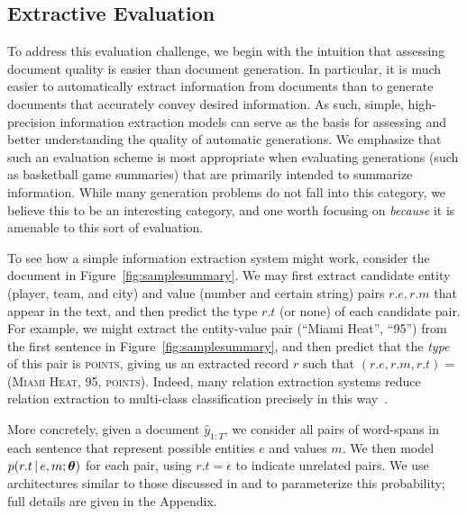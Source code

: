 \documentclass[11pt,letterpaper]{article}
\begin{document}
\subsection{Extractive Evaluation}
\label{sec:extractive}
To address this evaluation challenge, we begin with the intuition that assessing document quality is easier than document generation. In particular, it is much easier to automatically extract information from documents than to generate documents that accurately convey desired information. As such, simple, high-precision information extraction models can serve
as the basis for assessing and better understanding the quality of automatic generations. 
We emphasize that such an evaluation scheme is most appropriate when evaluating generations (such as basketball game summaries) that are primarily intended to summarize information. While many generation problems do not fall into this category, we believe this to be an interesting category, and one worth focusing on \textit{because} it is amenable to this sort of evaluation.

To see how a simple information extraction system might work, consider the document in Figure~\ref{fig:samplesummary}. We may first extract candidate entity (player, team, and city) and value (number and
certain string) pairs $r.e, r.m$ that appear in the text, and then predict the type $r.t$ (or none) of each candidate pair. For example, we might extract the entity-value pair (``Miami Heat'', ``95'') from the first sentence in Figure~\ref{fig:samplesummary}, and then predict that the \textit{type} of this pair is \textsc{points}, giving us an extracted record $r$ such that $(r.e, r.m, r.t) = $ (\textsc{Miami Heat}, 95, \textsc{points}). Indeed, many relation extraction systems
reduce relation extraction to multi-class classification precisely in this
way~\citep{zhang2004weakly,zhou2008semi,zeng2014relation,dosSantos2015classifying}. 

More concretely, given a document $\hat{y}_{1:T}$, we consider all pairs of word-spans in each sentence
that represent possible entities $e$ and values $m$. We then model
$p(r.t \, | \, e, m;\boldsymbol{\theta})$ for each pair, using $r.t =\epsilon$ to
indicate unrelated pairs. We use architectures similar to those discussed in \citet{collobert2011natural} and
\citet{dosSantos2015classifying} to parameterize this probability; full details are given in the Appendix. 
\end{document}
